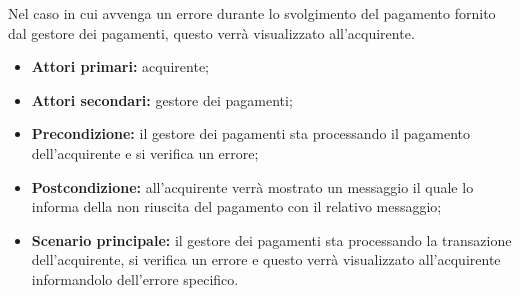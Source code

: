 \label{estensione:pagamento-fallito}

Nel caso in cui avvenga un errore durante lo svolgimento del pagamento fornito dal gestore dei pagamenti, questo verrà visualizzato all'acquirente.
\begin{itemize}
	\item \textbf{Attori primari:} acquirente;
	\item \textbf{Attori secondari:} gestore dei pagamenti;
	\item \textbf{Precondizione:} il gestore dei pagamenti sta processando il pagamento dell'acquirente e si verifica un errore;
	\item \textbf{Postcondizione:} all'acquirente verrà mostrato un messaggio il quale lo informa della non riuscita del pagamento con il relativo messaggio;
	\item \textbf{Scenario principale:} il gestore dei pagamenti sta processando la transazione dell'acquirente, si verifica un errore e questo verrà visualizzato all'acquirente informandolo dell'errore specifico.
\end{itemize}